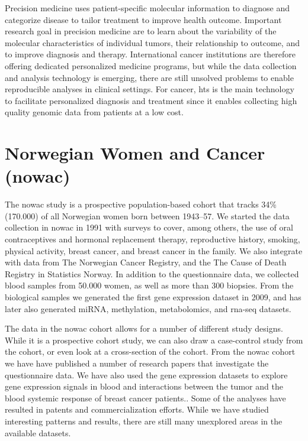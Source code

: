 Precision medicine uses patient-specific molecular information to diagnose and
categorize disease to tailor treatment to improve health
outcome.\cite{national2011toward} Important research goal in precision medicine
are to learn about the variability of the molecular characteristics of
individual tumors, their relationship to outcome, and to improve diagnosis and
therapy.\cite{tannock2016limits} International cancer institutions are therefore
offering dedicated personalized medicine programs, but while the data collection
and analysis technology is emerging, there are still unsolved problems to enable
reproducible analyses in clinical settings. For cancer, \gls{hts}
is the main technology to facilitate personalized diagnosis and
treatment since it enables collecting high quality genomic data from patients
at a low cost. 

\section{Norwegian Women and Cancer (\gls{nowac})} 
The \gls{nowac} study is a prospective population-based cohort that tracks 34\%
(170.000) of all Norwegian women born between 1943–57.\cite{nowac} We
started the data collection in \gls{nowac} in 1991 with surveys to cover,
among others, the use of oral contraceptives and hormonal replacement therapy,
reproductive history, smoking, physical activity, breast cancer, and breast
cancer in the family. We also integrate with data from The Norwegian Cancer
Registry, and the The Cause of Death Registry in Statistics Norway. In addition
to the questionnaire data, we collected blood samples from 50.000 women, as well
as more than 300 biopsies. From the biological samples we generated the first
gene expression dataset in 2009, and has later also generated miRNA,
methylation, metabolomics, and \gls{rna}-seq datasets. 

The data in the \gls{nowac} cohort allows for a number of different study
designs. While it is a prospective cohort study, we can also draw a case-control
study from the cohort, or even look at a cross-section of the cohort.  From the
\gls{nowac} cohort we have have published a number of research papers that
investigate the questionnaire data\cite{find-some-papers}. We have also used the
gene expression datasets to explore gene expression signals in blood and
interactions between the tumor and the blood systemic response of breast cancer
patients.\cite{holden2017local, dumeaux2017interactions}. Some of the analyses
have resulted in patents\cite{blobrec} and commercialization efforts.  While we have
studied interesting patterns and results, there are still many unexplored areas
in the available datasets.

